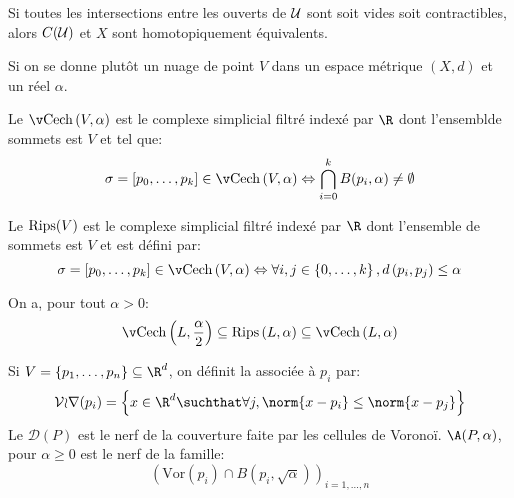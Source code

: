 \begin{thm}
	Si toutes les intersections entre les ouverts de $\mathcal{U}$ sont soit vides soit contractibles, alors $C(\mathcal{U})$ et $X$ sont homotopiquement équivalents.
\end{thm}

Si on se donne plutôt un nuage de point $V$ dans un espace métrique $(X, d)$ et un réel $\alpha$.
\begin{definition}
	Le  $\cech\left(V, \alpha\right)$ est le complexe simplicial
	filtré indexé par $\R$ dont l'ensemblde sommets est $V$ et tel que:
	\begin{equation*}
		\sigma = \left[p_{0}, \ldots, p_{k}\right] \in \cech\left(V, \alpha\right) \Leftrightarrow \bigcap_{i = 0}^{k} B(p_{i}, \alpha) \neq \emptyset
	\end{equation*}
\end{definition}

\begin{definition}
	Le  $\operatorname{Rips}(V)$ est le complexe simplicial filtré indexé par $\R$ dont l'ensemble de sommets est $V$
	et est défini par:
	\begin{equation*}
		\sigma = \left[p_{0}, \ldots, p_{k}\right] \in \cech\left(V, \alpha\right) \Leftrightarrow \forall i, j \in \left\{0, \ldots, k\right\}, d\left(p_{i}, p_{j}\right) \leq \alpha
	\end{equation*}
\end{definition}

\begin{proposition}
	On a, pour tout $\alpha > 0$:
	\begin{equation*}
		\cech\left(L, \frac{\alpha}{2}\right) \subseteq \rips\left(L, \alpha\right) \subseteq \cech\left(L, \alpha\right)
	\end{equation*}
\end{proposition}

\begin{definition}
	Si $V = \{p_{1}, \ldots, p_{n}\} \subseteq \R^{d}$, on définit la  associée à $p_{i}$ par:
	\begin{equation*}
		\mathcal{Vor}(p_{i}) = \left\{x \in \R^{d}\suchthat \forall j, \norm{x - p_{i}} \leq \norm{x - p_{j}}\right\}
	\end{equation*}
	Le  $\mathcal{D}(P)$ est le nerf de la couverture faite par les cellules de Voronoï.
	 $\A(P, \alpha)$, pour $\alpha \geq 0$ est le nerf de la famille:
	\begin{equation*}
		(\mathrm{Vor}(p_{i}) \cap B(p_{i}, \sqrt{\alpha}))_{i = 1, \ldots, n}
	\end{equation*}
\end{definition}

